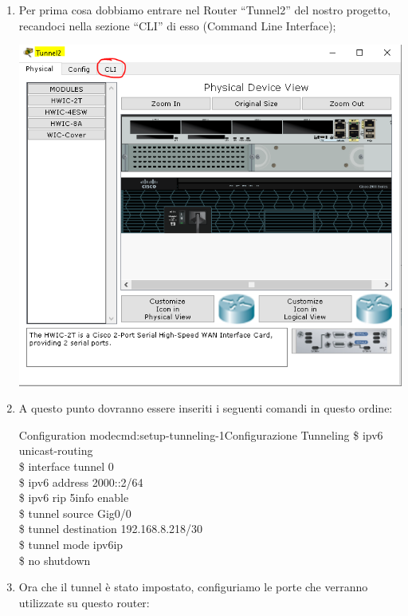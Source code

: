 \begin{enumerate}
    \item Per prima cosa dobbiamo entrare nel Router “Tunnel2” del nostro progetto, recandoci nella sezione “CLI” di esso (Command Line Interface);\par
    \begin{center}
        \includegraphics[width=\linewidth]{images/07.routing-sicurezza/tunneling/10.png}
    \end{center}
    \item A questo punto dovranno essere inseriti i seguenti comandi in questo ordine:\par
    \begin{cmds}{Configuration mode}{cmd:setup-tunneling-1}{Configurazione Tunneling}
        \$ ipv6 unicast-routing\\
        \$ interface tunnel 0\\
        \$ ipv6 address 2000::2/64\\
        \$ ipv6 rip 5info enable\\
        \$ tunnel source Gig0/0\\
        \$ tunnel destination 192.168.8.218/30\\
        \$ tunnel mode ipv6ip\\
        \$ no shutdown
    \end{cmds}
    \item Ora che il tunnel è stato impostato, configuriamo le porte che verranno utilizzate su questo router:\par

\end{enumerate}
